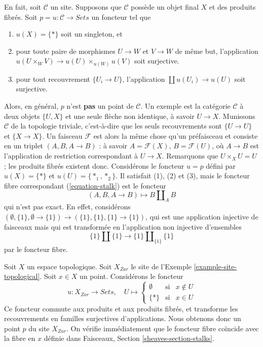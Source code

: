 \begin{remark}
\label{remark-improve-proposition-points-limits}
En fait, soit $\mathcal{C}$ un site. Supposons que $\mathcal{C}$ possède un objet final
$X$ et des produits fibrés. Soit $p = u: \mathcal{C} \to \textit{Sets}$ un
foncteur tel que
\begin{enumerate}
\item $u(X) = \{*\}$ soit un singleton, et
\item pour toute paire de morphismes $U \to W$ et $V \to W$ de
même but, l’application
$u(U \times_W V) \to u(U) \times_{u(W)} u(V)$ soit surjective.
\item pour tout recouvrement $\{U_i \to U\}$, l’application
$\coprod u(U_i) \to u(U)$ soit surjective.
\end{enumerate}
Alors, en général, $p$ n’est {\bf pas} un point de $\mathcal{C}$.
Un exemple est la catégorie $\mathcal{C}$ à deux objets $\{U, X\}$
et une seule flèche non identique, à savoir $U \to X$. Munissons $\mathcal{C}$
de la topologie triviale, c’est-à-dire que les seuls recouvrements sont $\{U \to U\}$ et
$\{X \to X\}$. Un faisceau $\mathcal{F}$ est alors la même chose qu’un préfaisceau et
consiste en un triplet $(A, B, A \to B)$ : à savoir $A = \mathcal{F}(X)$,
$B = \mathcal{F}(U)$, où $A \to B$ est l’application de restriction correspondant
à $U \to X$. Remarquons que $U \times_X U = U$ ; les produits fibrés existent donc.
Considérons le foncteur $u = p$ défini par $u(X) = \{*\}$ et $u(U) = \{*_1, *_2\}$.
Il satisfait (1), (2) et (3), mais le foncteur fibre correspondant
(\ref{equation-stalk}) est le foncteur
$$
(A, B, A \to B) \longmapsto B \amalg_A B
$$
qui n’est pas exact. En effet, considérons
$(\emptyset, \{1\}, \emptyset \to \{1\}) \to (\{1\}, \{1\}, \{1\} \to \{1\})$,
qui est une application injective de faisceaux mais qui est transformée en l’application
non injective d’ensembles
$$
\{1\} \amalg \{1\} \longrightarrow \{1\} \amalg_{\{1\}} \{1\}
$$
par le foncteur fibre.
\end{remark}

\begin{example}
\label{example-point-topological}
Soit $X$ un espace topologique. Soit $X_{Zar}$ le site de
l’Exemple \ref{example-site-topological}.
Soit $x \in X$ un point. Considérons le foncteur
$$
u : X_{Zar} \longrightarrow \textit{Sets}, \quad
U \mapsto
\left\{
\begin{matrix}
\emptyset & \text{si} & x \not \in U \\
\{*\} & \text{si} & x \in U
\end{matrix}
\right.
$$
Ce foncteur commute aux produits et aux produits fibrés,
et transforme les recouvrements en familles surjectives d’applications.
Nous obtenons donc un point $p$ du site $X_{Zar}$.
On vérifie immédiatement que le foncteur fibre
coïncide avec la fibre en $x$ définie dans
Faisceaux, Section
\ref{sheaves-section-stalks}.
\end{example}

